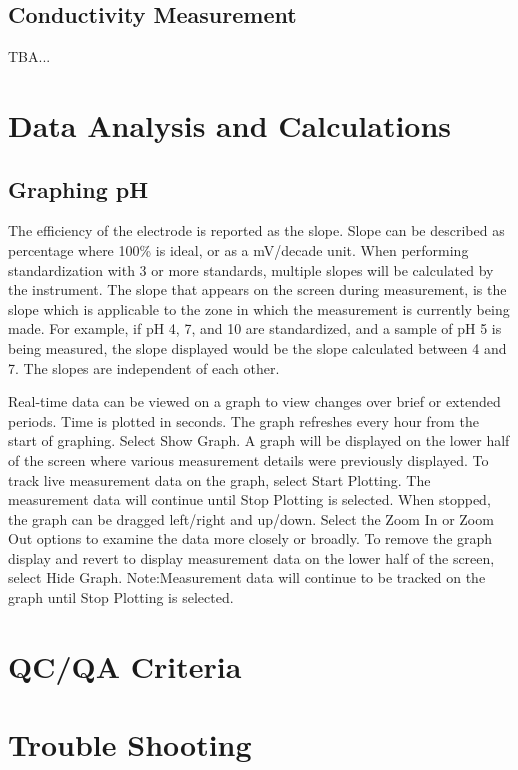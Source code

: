 \documentclass[12pt]{../SOP3}\usepackage[]{graphicx}\usepackage[]{xcolor}
\begin{document}
\subsection{Conductivity Measurement}
\NP TBA...


\section{Data Analysis and Calculations}

\subsection{Graphing pH}
\NP The efficiency of the electrode is reported as the slope. Slope can be described as percentage where 100\% is ideal, or as a mV/decade unit. When performing  standardization with 3 or more standards, multiple slopes will be calculated by the  instrument. The slope that appears on the screen during measurement, is the slope which is applicable to the zone in which the measurement is currently being made. For example, if pH 4, 7, and 10 are standardized, and a sample of pH 5 is being measured, the slope displayed would be the slope calculated between 4 and 7. The slopes are independent of each other. 

\NP Real-time data can be viewed on a graph to view changes over brief or  extended  periods. Time  is  plotted  in  seconds. The  graph  refreshes  every  hour  from  the  start of graphing.
\NP Select Show Graph. A graph will be displayed on the lower half of the screen where various measurement details were previously displayed.  
\NP To track live measurement data on the graph, select 
Start Plotting. The measurement data will continue until 
Stop Plotting is selected. When stopped, the graph can be dragged left/right and up/down.
\NP Select the Zoom In or Zoom Out options to examine the data more closely or broadly.
\NP To remove the graph display and revert to display measurement data on the lower half of the screen, select Hide Graph. Note:Measurement  data  will  continue  to  be  tracked  on  the  graph  until  Stop  Plotting is  selected.  

\section{QC/QA Criteria}

\section{Trouble Shooting}
\end{document}
